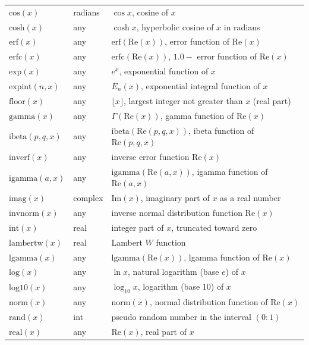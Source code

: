 \documentclass[
  hyper, 
  lang = cn, 
  class = l3doc,
  classOption={11pt},
  sect = {load=false},
]{../../zlatex/code/ztex}
\begin{document}
\begin{center}
\begin{longtable}{lll}
    \(\text{cos}(x)\) & radians & $\cos x$, cosine of $x$ \\
    \(\text{cosh}(x)\) & any & $\cosh x$, hyperbolic cosine of $x$ in radians \\
    \(\text{erf}(x)\) & any & $\text{erf}(\text{Re}(x))$, error function of $\text{Re}(x)$ \\
    \(\text{erfc}(x)\) & any & $\text{erfc}(\text{Re}(x))$, $1.0 - $ error function of $\text{Re}(x)$ \\
    \(\text{exp}(x)\) & any & $e^x$, exponential function of $x$ \\
    \(\text{expint}(n,x)\) & any & $E_n(x)$, exponential integral function of $x$ \\
    \(\text{floor}(x)\) & any & $\lfloor x \rfloor$, largest integer not greater than $x$ (real part) \\
    \(\text{gamma}(x)\) & any & $\Gamma(\text{Re}(x))$, gamma function of $\text{Re}(x)$ \\
    \(\text{ibeta}(p,q,x)\) & any & $\text{ibeta}(\text{Re}(p,q,x))$, ibeta function of $\text{Re}(p,q,x)$ \\
    \(\text{inverf}(x)\) & any & inverse error function $\text{Re}(x)$ \\
    \(\text{igamma}(a,x)\) & any & $\text{igamma}(\text{Re}(a,x))$, igamma function of $\text{Re}(a,x)$ \\
    \(\text{imag}(x)\) & complex & $\text{Im}(x)$, imaginary part of $x$ as a real number \\
    \(\text{invnorm}(x)\) & any & inverse normal distribution function $\text{Re}(x)$ \\
    \(\text{int}(x)\) & real & integer part of $x$, truncated toward zero \\
    \(\text{lambertw}(x)\) & real & Lambert $W$ function \\
    \(\text{lgamma}(x)\) & any & $\text{lgamma}(\text{Re}(x))$, lgamma function of $\text{Re}(x)$ \\
    \(\text{log}(x)\) & any & $\ln x$, natural logarithm (base $e$) of $x$ \\
    \(\text{log10}(x)\) & any & $\log_{10} x$, logarithm (base 10) of $x$ \\
    \(\text{norm}(x)\) & any & $\text{norm}(x)$, normal distribution function of $\text{Re}(x)$ \\
    \(\text{rand}(x)\) & int & pseudo random number in the interval $(0:1)$ \\
    \(\text{real}(x)\) & any & $\text{Re}(x)$, real part of $x$ \\

\end{longtable}
\end{center}
\end{document}
